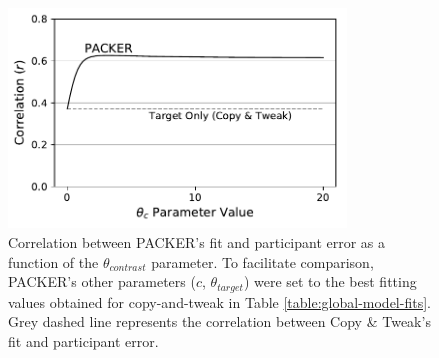 \begin{figure}
    \begin{center}
    \includegraphics[width=0.8\textwidth]{figs/packer-corr.pdf}
    \caption{Correlation between PACKER's fit and participant error as a
function of the $\theta_{contrast}$ parameter. To facilitate comparison,
PACKER's other parameters ($c$, $\theta_{target}$) were set to the best fitting
values obtained for copy-and-tweak in Table \ref{table:global-model-fits}. Grey
dashed line represents the correlation between Copy \& Tweak's fit and
participant error.}
    \label{fig:packer-corr}
    \end{center}
\end{figure}

